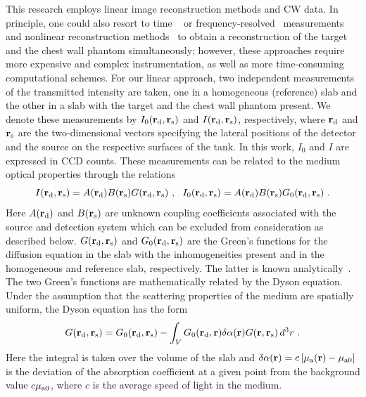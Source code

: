 This research employs linear image reconstruction methods and CW data. In principle, one could also resort to time ~\cite{patterson_89_1,benaron_93_1,andersson-engels_90_1,jacques_89_1,schmidt_00_2,ntziachristos_98_1} or frequency-resolved~\cite{gratton_90_1,fishkin_93_1,chance_98_1,pogue_94_1} measurements and nonlinear reconstruction methods~\cite{arridge_99_1,markel_03_2} to obtain a reconstruction of the target and the chest wall phantom simultaneously; however, these approaches require more expensive and complex instrumentation, as well as more time-consuming computational schemes. For our linear approach, two independent measurements of the transmitted intensity are taken, one in a homogeneous (reference) slab and the other in a slab with the target and the chest wall phantom present. We denote these measurements by $I_0({\bf r}_{\rm d}, {\bf r}_{\rm s})$ and $I({\bf r}_{\rm d}, {\bf r}_{\rm s})$, respectively, where ${\bf r}_{\rm d}$ and ${\bf r}_{\rm s}$ are the two-dimensional vectors specifying the lateral positions of the detector and the source on the respective
surfaces of the tank. In this work, $I_0$ and $I$ are expressed in CCD counts. These measurements can be related to the medium optical properties through the relations
%
\begin{equation}
I({\bf r}_{\rm d}, {\bf r}_{\rm s}) =
A({\bf r}_{\rm d})B({\bf r}_{\rm s})G({\bf r}_{\rm d},{\bf r}_{\rm s})
\ , \ \ 
I_0({\bf r}_{\rm d},{\bf r}_{\rm s})=
A({\bf r}_{\rm d})B({\bf r}_{\rm s})G_0({\bf r}_{\rm d},{\bf r}_{\rm
  s}) \ .
\label{eq1}
\end{equation}
%
\noindent
Here $A({\bf r}_{\rm d})$ and $B({\bf r}_{\rm s})$ are unknown coupling coefficients associated with the source and detection system which can be excluded from consideration as described below. $G({\bf r}_{\rm d}, {\bf r}_{\rm s})$ and $G_0({\bf r}_{\rm d}, {\bf r}_{\rm  s})$ are the Green's functions for the diffusion equation in the slab with the inhomogeneities present and in the homogeneous and reference slab, respectively. The latter is known analytically~\cite{markel_04_4}. The two Green's functions are mathematically related by the Dyson equation. Under the assumption that the scattering properties of the medium are spatially uniform, the Dyson equation has the form
%
\begin{equation}
G({\bf r}_{\rm d}, {\bf r}_{\rm s}) = G_0({\bf r}_{\rm d}, {\bf r}_{\rm s}) -
\int_V G_0({\bf r}_{\rm d}, {\bf r}) \delta\alpha({\bf r}) G({\bf r},
{\bf r}_{\rm s})\,d^3r \ .
\label{eq2}
\end{equation}
%
\noindent
Here the integral is taken over the volume of the slab and $\delta\alpha({\bf r}) = c\left[\mu_{\rm a}({\bf r}) - \mu_{{\rm a}0} \right]$ is the deviation of the absorption coefficient at a given point from the background value $c\mu_{{\rm a}0}$, where $c$ is the average speed of light in the medium.

